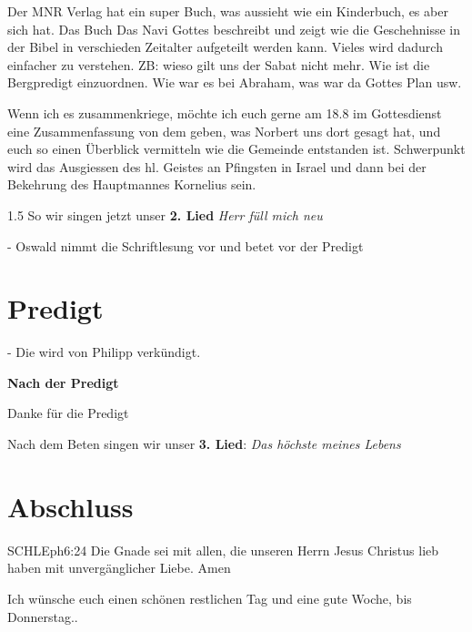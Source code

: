 \documentclass{../inc/mybib}
\begin{document}
\begin{spacing}{1.5}
Der MNR Verlag hat ein super Buch, was aussieht wie ein Kinderbuch, es aber sich hat. Das Buch \glqq Das Navi Gottes \grqq{} beschreibt und zeigt wie die  Geschehnisse in der Bibel in verschieden Zeitalter aufgeteilt werden kann. Vieles wird dadurch einfacher zu verstehen. ZB: wieso gilt uns der Sabat nicht mehr. Wie ist die Bergpredigt einzuordnen. Wie war es bei Abraham, was war da Gottes Plan usw.

Wenn ich es zusammenkriege, möchte ich euch gerne am 18.8 im Gottesdienst eine Zusammenfassung von dem geben, was Norbert uns dort gesagt hat, und euch so einen Überblick vermitteln wie die Gemeinde entstanden ist. Schwerpunkt wird das Ausgiessen des hl. Geistes an Pfingsten in Israel und dann bei der Bekehrung des Hauptmannes Kornelius sein.


\end{spacing}{1.5}
So wir singen jetzt unser \textbf{2. Lied} \textit{Herr füll mich neu}

- Oswald nimmt die Schriftlesung vor und betet vor der Predigt

\section{Predigt}
- Die wird von Philipp verkündigt.

\textbf{Nach der Predigt}

Danke für die Predigt

Nach dem Beten singen wir unser \textbf{3. Lied}: \textit{Das höchste meines Lebens}\\

\section{Abschluss}

\begin{bibelbox}{SCHL}{Eph}{6:24}
Die Gnade sei mit allen, die unseren Herrn Jesus Christus lieb haben mit unvergänglicher Liebe. Amen
\end{bibelbox}

Ich wünsche euch einen schönen restlichen Tag und eine gute Woche, bis Donnerstag..
\end{document}
